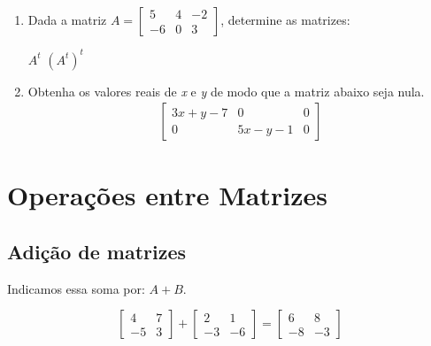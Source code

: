 \begin{multicols}{2}
\begin{enumerate}[label*=\protect\fbox{\arabic{enumi}}]
    \item {
        Dada a matriz $A = \begin{bmatrix}
          5 & 4 & -2 \\
          -6 & 0 & 3
        \end{bmatrix}$,
        determine as matrizes:
        \begin{tasks}
          \task $A^t$
          \task $(A^t)^t$
        \end{tasks}
      }

    \item {
        Obtenha os valores reais de \textit{x} e \textit{y} de modo que a matriz abaixo seja nula.
        \begin{equation*}
            \begin{split}
              \begin{bmatrix}
                3x + y - 7 & 0 & 0 \\
                0 & 5x - y - 1 & 0
              \end{bmatrix}
            \end{split}
        \end{equation*}
      }
  \end{enumerate}
  
\end{multicols}

\section{Operações entre Matrizes}

\subsection{Adição de matrizes}


  Indicamos essa soma por: $A + B$.
\begin{example}
  \begin{equation*}
    \begin{bmatrix}
      4 & 7 \\
      -5 & 3 
    \end{bmatrix}
    + \begin{bmatrix}
      2 & 1 \\
      -3 & -6 
    \end{bmatrix}
    = \begin{bmatrix}
      6 & 8 \\
      -8 & -3 
    \end{bmatrix}
  \end{equation*}
\end{example}

